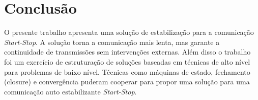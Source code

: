 
\section{Conclusão}

O presente trabalho apresenta uma solução de estabilização para a 
comunicação \emph{Start-Stop}. 
A solução torna a comunicação mais lenta, mas garante a continuidade 
de transmissões sem intervenções externas. 
Além disso o trabalho foi um exercício de estruturação de soluções 
baseadas em técnicas de alto nível para problemas de baixo nível.
Técnicas como máquinas de estado, fechamento (closure) e convergência
puderam cooperar para propor uma solução para uma comunicação auto 
estabilizante \emph{Start-Stop}.
